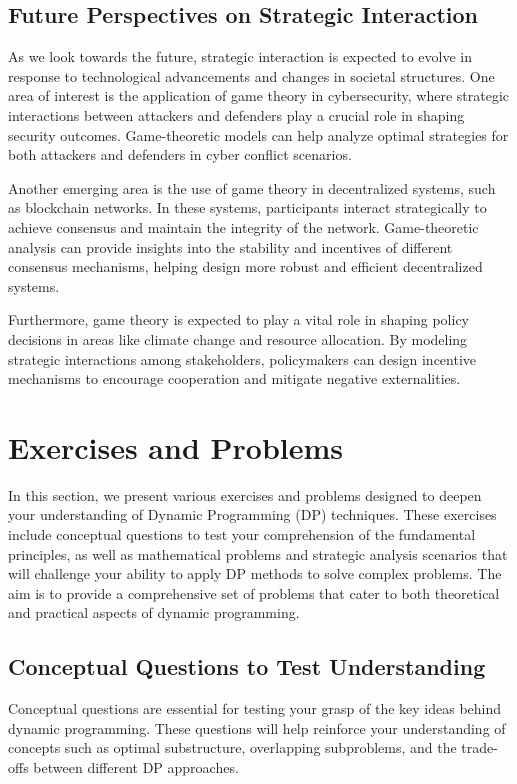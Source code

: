 \documentclass[12pt]{book} %
\begin{document}
\subsection{Future Perspectives on Strategic Interaction}
As we look towards the future, strategic interaction is expected to evolve in response to technological advancements and changes in societal structures. One area of interest is the application of game theory in cybersecurity, where strategic interactions between attackers and defenders play a crucial role in shaping security outcomes. Game-theoretic models can help analyze optimal strategies for both attackers and defenders in cyber conflict scenarios.

Another emerging area is the use of game theory in decentralized systems, such as blockchain networks. In these systems, participants interact strategically to achieve consensus and maintain the integrity of the network. Game-theoretic analysis can provide insights into the stability and incentives of different consensus mechanisms, helping design more robust and efficient decentralized systems.

Furthermore, game theory is expected to play a vital role in shaping policy decisions in areas like climate change and resource allocation. By modeling strategic interactions among stakeholders, policymakers can design incentive mechanisms to encourage cooperation and mitigate negative externalities.

\section{Exercises and Problems}
In this section, we present various exercises and problems designed to deepen your understanding of Dynamic Programming (DP) techniques. These exercises include conceptual questions to test your comprehension of the fundamental principles, as well as mathematical problems and strategic analysis scenarios that will challenge your ability to apply DP methods to solve complex problems. The aim is to provide a comprehensive set of problems that cater to both theoretical and practical aspects of dynamic programming.

\subsection{Conceptual Questions to Test Understanding}
Conceptual questions are essential for testing your grasp of the key ideas behind dynamic programming. These questions will help reinforce your understanding of concepts such as optimal substructure, overlapping subproblems, and the trade-offs between different DP approaches.
\end{document}
